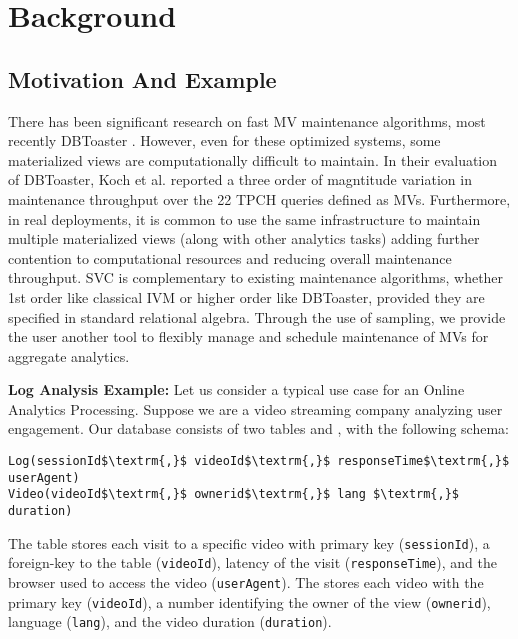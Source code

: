 \section{Background}\label{sec-background}

\subsection{Motivation And Example}\label{subsec-inc}
There has been significant research on fast MV maintenance algorithms, most recently DBToaster \cite{DBLP:journals/vldb/KochAKNNLS14}.
However, even for these optimized systems, some materialized views are computationally difficult to maintain.
In their evaluation of DBToaster, Koch et al. \cite{DBLP:journals/vldb/KochAKNNLS14} reported a three order of magntitude variation in maintenance
throughput over the 22 TPCH queries defined as MVs.
Furthermore, in real deployments, it is common to use the same infrastructure to maintain multiple materialized views (along with other analytics tasks) adding further contention to computational resources and reducing overall maintenance throughput.
SVC is complementary to existing maintenance algorithms, whether 1st order like classical IVM or higher order like DBToaster, provided they are specified in standard relational algebra.
Through the use of sampling, we provide the user another tool to flexibly manage and schedule maintenance of MVs for aggregate analytics.

\vspace{0.25em}

\noindent \textbf{Log Analysis Example: } Let us consider a typical use case for an Online Analytics Processing.
Suppose we are a video streaming company analyzing user engagement.
Our database consists of two tables  and , with the following schema:
\begin{lstlisting}[mathescape,basicstyle={\scriptsize}]
Log(sessionId$\textrm{,}$ videoId$\textrm{,}$ responseTime$\textrm{,}$ userAgent)
Video(videoId$\textrm{,}$ ownerid$\textrm{,}$ lang $\textrm{,}$ duration)
\end{lstlisting}
The  table stores each visit to a specific video with primary key (\texttt{sessionId}), a foreign-key to the  table (\texttt{videoId}), latency of the visit (\texttt{responseTime}), and the browser used to access the video (\texttt{userAgent}).
The  stores each video with the primary key (\texttt{videoId}), a number identifying the owner of the view (\texttt{ownerid}), language (\texttt{lang}), and the video duration (\texttt{duration}).

